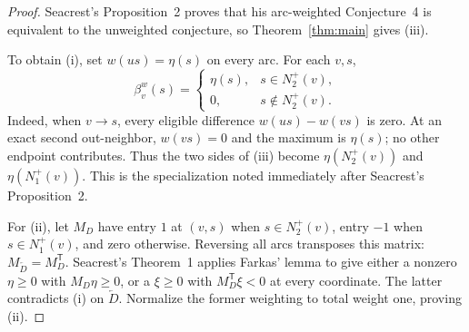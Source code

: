 \begin{proof}
Seacrest's Proposition~2 proves that his arc-weighted Conjecture~4 is
equivalent to the unweighted conjecture, so Theorem~\ref{thm:main} gives
\textup{(iii)}.

To obtain \textup{(i)}, set $w(us)=\eta(s)$ on every arc.  For each $v,s$,
\[
 \beta_v^w(s)=
 \begin{cases}
  \eta(s),&s\in N_2^+(v),\\
  0,&s\notin N_2^+(v).
 \end{cases}
\]
Indeed, when $v\to s$, every eligible difference $w(us)-w(vs)$ is zero.
At an exact second out-neighbor, $w(vs)=0$ and the maximum is $\eta(s)$;
no other endpoint contributes.  Thus the two sides of \textup{(iii)}
become $\eta(N_2^+(v))$ and $\eta(N_1^+(v))$.  This is the
specialization noted immediately after Seacrest's Proposition~2.

For \textup{(ii)}, let $M_D$ have entry $1$ at $(v,s)$ when
$s\in N_2^+(v)$, entry $-1$ when $s\in N_1^+(v)$, and zero otherwise.
Reversing all arcs transposes this matrix:
$M_{\overleftarrow D}=M_D^{\mathsf T}$.  Seacrest's Theorem~1 applies
Farkas' lemma to give either a nonzero $\eta\ge0$ with $M_D\eta\ge0$,
or a $\xi\ge0$ with $M_D^{\mathsf T}\xi<0$ at every coordinate.
The latter contradicts \textup{(i)} on $\overleftarrow D$.
Normalize the former weighting to total weight one, proving \textup{(ii)}.
\end{proof}
